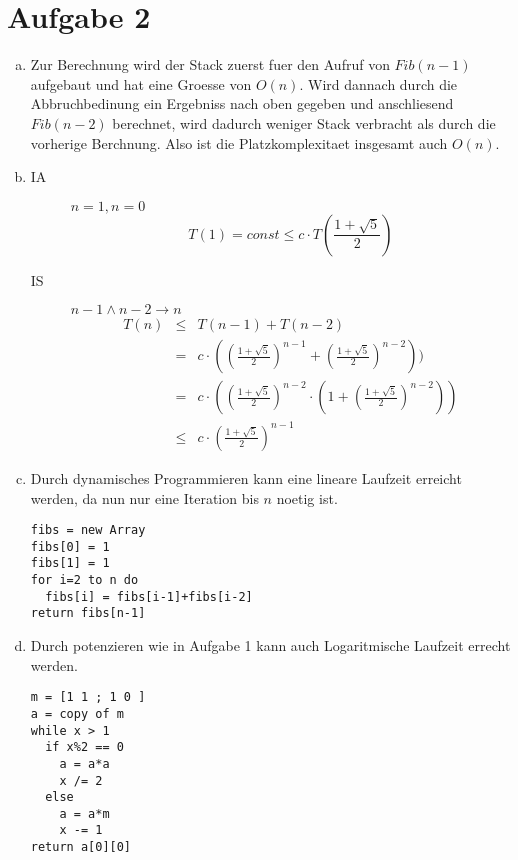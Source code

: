 \section*{Aufgabe 2}
\begin{enumerate}[(a)]
\item 

Zur Berechnung wird der Stack zuerst fuer den Aufruf von $Fib(n-1)$ aufgebaut und hat eine 
Groesse von $O(n)$. Wird dannach durch die Abbruchbedinung ein Ergebniss nach oben gegeben und anschliesend $Fib(n-2)$ 
berechnet, wird dadurch weniger Stack verbracht als durch die vorherige
Berchnung. Also ist die Platzkomplexitaet insgesamt auch $O(n)$.

\item

\begin{description}
\item[IA] $n=1, n=0$\\
 \begin{equation}
    T(1) = const \leq c \cdot T(\frac{1+\sqrt{5}}{2})
 \end{equation}
\item[IS] $n-1 \land n-2 \to n$\\
    \begin{eqnarray}
    T(n) &\leq& T(n-1) + T(n-2) \\
         &=& c \cdot ( (\frac{1+\sqrt 5}{2})^{n-1} + (\frac{1+\sqrt 5}{2})^{n-2}) ) \\
         &=& c \cdot ( (\frac{1+\sqrt 5}{2})^{n-2} \cdot (1 + (\frac{1+\sqrt 5}{2})^{n-2}) ) \\
         &\leq& c \cdot (\frac{1+\sqrt 5}{2})^{n-1}
    \end{eqnarray}
    \vskip 4cm
\end{description}


\item Durch dynamisches Programmieren kann eine lineare Laufzeit erreicht werden, 
    da nun nur eine Iteration bis $n$ noetig ist.

\begin{verbatim}
fibs = new Array
fibs[0] = 1
fibs[1] = 1
for i=2 to n do
  fibs[i] = fibs[i-1]+fibs[i-2]
return fibs[n-1]
\end{verbatim}


\item 
Durch potenzieren wie in Aufgabe 1 kann auch Logaritmische Laufzeit errecht werden.
\begin{verbatim}
m = [1 1 ; 1 0 ]
a = copy of m
while x > 1
  if x%2 == 0
    a = a*a
    x /= 2
  else
    a = a*m
    x -= 1
return a[0][0]
\end{verbatim}
\end{enumerate}

